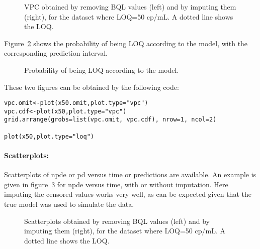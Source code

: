\begin{figure}[!h]
\par\kern -0.2cm
\begin{center}
\end{center}
\caption{VPC obtained by removing BQL values (left) and by imputing them (right), for the dataset where LOQ=50 cp/mL. A dotted line shows the LOQ.}\label{fig:x50.vpc}
\end{figure}
\clearpage

Figure~\ref{fig:x50.ploq} shows the probability of being LOQ according to the model, with the corresponding prediction interval.
\begin{figure}[!h]
\par\kern -0.3cm
\begin{center}
\end{center}
\caption{Probability of being LOQ according to the model.}\label{fig:x50.ploq}
\end{figure}

These two figures can be obtained by the following code:
\begin{verbatim}
vpc.omit<-plot(x50.omit,plot.type="vpc")
vpc.cdf<-plot(x50,plot.type="vpc")
grid.arrange(grobs=list(vpc.omit, vpc.cdf), nrow=1, ncol=2)

plot(x50,plot.type="loq")
\end{verbatim} 

\clearpage
\paragraph{Scatterplots:} Scatterplots of npde or pd versus time or predictions are available. An example is given in figure~\ref{fig:x50.xscatter} for npde versus time, with or without imputation. Here imputing the censored values works very well, as can be expected given that the true model was used to simulate the data.

\begin{figure}[!h]
\par\kern -0.2cm
\begin{center}
\end{center}
\par\kern -7cm
\caption{Scatterplots obtained by removing BQL values (left) and by imputing them (right), for the dataset where LOQ=50 cp/mL. A dotted line shows the LOQ.}\label{fig:x50.xscatter}
\end{figure}

